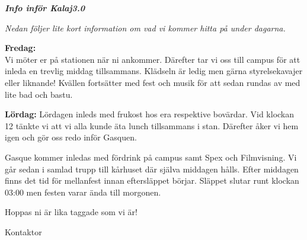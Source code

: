 \documentclass[11pt]{article}
\def\doctitle{Info inför Kalaj3.0}
\begin{document}
    
    
        \begin{center}
    
            \textit{\textbf{\Large \doctitle}}
    
        \end{center}
        \vspace{8mm}
        
        {\it
        Nedan följer lite kort information om vad vi kommer hitta på under dagarna.
        
        \textbf{Fredag:}\\
        Vi möter er på stationen när ni ankommer. Därefter tar vi oss till campus för att inleda en trevlig middag tillsammans. Klädseln är ledig men gärna styrelsekavajer eller liknande!
        Kvällen fortsätter med fest och musik för att sedan rundas av med lite bad och bastu.
        
        \textbf{Lördag:}
        Lördagen inleds med frukost hos era respektive bovärdar. Vid klockan 12 tänkte vi att vi alla kunde äta lunch tillsammans i stan. Därefter åker vi hem igen och gör oss redo inför Gasquen.

        Gasque kommer inledas med fördrink på campus samt Spex och Filmvisning. Vi går sedan i samlad trupp till kårhuset där själva middagen hålls. Efter middagen finns det tid för mellanfest innan eftersläppet börjar. Släppet slutar runt klockan 03:00 men festen varar ända till morgonen.
        
        \vspace{15mm}
        Hoppas ni är lika taggade som vi är!
       
        
        }
        \begin{signatures}{1}
            \signature{Axel Voss}{Kontaktor}
            \end{signatures}         
    
\end{document}
